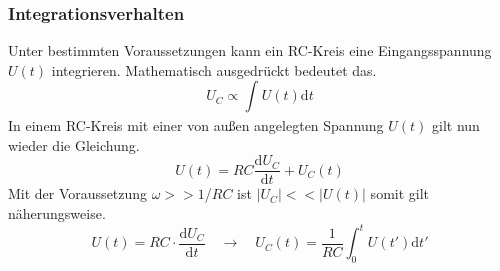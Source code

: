 \subsubsection{Integrationsverhalten}
Unter bestimmten Voraussetzungen kann ein RC-Kreis eine Eingangsspannung $U(t)$ integrieren. Mathematisch ausgedrückt bedeutet das.
\begin{equation*}
U_{C} \propto \int_{}^{} U(t) \text{d}t
\end{equation*}
In einem RC-Kreis mit einer von außen angelegten Spannung $U(t)$ gilt nun wieder die Gleichung.
\begin{equation*}
U(t) = RC \frac{\text{d}U_{C}}{\text{d}t} + U_{C}(t)
\end{equation*}
Mit der Voraussetzung $\omega >> 1$/$RC$ ist $|U_{C}| << |U(t)|$ somit gilt näherungsweise.
\begin{equation*}
U(t) = RC \cdot \frac{\text{d}U_{C}}{\text{d}t} \quad \to \quad U_{C}(t) = \frac{1}{RC} \int_{0}^{t}U(t') \text{d}t'
\end{equation*}